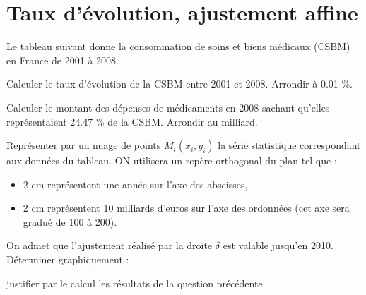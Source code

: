 \section{Taux d'évolution, ajustement affine}

Le tableau suivant donne la consommation de soins et biens médicaux (CSBM) en France de 2001 à 2008.

\begin{questions}
	\question[] Calculer le taux d'évolution de la CSBM entre 2001 et 2008. Arrondir à \num{0.01} \%.
	
	\question[] Calculer le montant des dépenses de médicaments en 2008 sachant qu'elles représentaient \num{24.47}  \% de la CSBM. Arrondir au milliard.
	
	\question[] Représenter par un nuage de points $M_i(x_i, y_i)$ la série statistique correspondant aux données du tableau. ON utilisera un repère orthogonal du plan tel que :
	\begin{itemize}
		\item 2 cm représentent une année sur l'axe des abscisses,
		
		\item 2 cm représentent 10 milliards d'euros sur l'axe des ordonnées (cet axe sera gradué de 100 à 200).
		
	\end{itemize}

	\question[] 
	
		\question[] On admet que l'ajustement réalisé par la droite $\delta$ est valable jusqu'en 2010. Déterminer graphiquement :
		
		\question[] justifier par le calcul les résultats de la question précédente.
\end{questions}